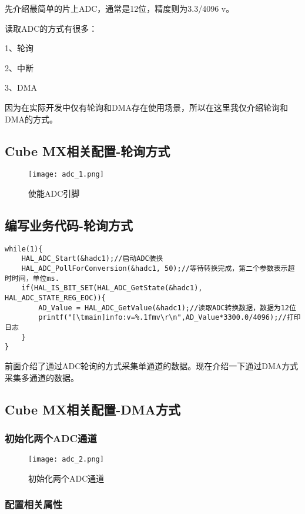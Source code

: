 \documentclass[cn,11pt]{elegantbook}
\begin{document}
先介绍最简单的片上ADC，通常是12位，精度则为3.3/4096 v。

读取ADC的方式有很多：

 1、轮询 
 
 2、中断 
 
 3、DMA 
 
因为在实际开发中仅有轮询和DMA存在使用场景，所以在这里我仅介绍轮询和DMA的方式。

\subsection{Cube MX相关配置-轮询方式}

\begin{figure}[htbp]
	\centering
	\texttt{[image: adc\_1.png]}
	\caption{使能ADC引脚 \label{fig:scatter}}
\end{figure}

\subsection{编写业务代码-轮询方式}
\lstset{language=C}
\begin{lstlisting}
while(1){
	HAL_ADC_Start(&hadc1);//启动ADC装换
	HAL_ADC_PollForConversion(&hadc1, 50);//等待转换完成，第二个参数表示超时时间，单位ms.
	if(HAL_IS_BIT_SET(HAL_ADC_GetState(&hadc1), HAL_ADC_STATE_REG_EOC)){
		AD_Value = HAL_ADC_GetValue(&hadc1);//读取ADC转换数据，数据为12位
		printf("[\tmain]info:v=%.1fmv\r\n",AD_Value*3300.0/4096);//打印日志
	}
}
\end{lstlisting}

前面介绍了通过ADC轮询的方式采集单通道的数据。现在介绍一下通过DMA方式采集多通道的数据。

\subsection{Cube MX相关配置-DMA方式}
\subsubsection{初始化两个ADC通道}
\newpage
\begin{figure}[htbp]
	\centering
	\texttt{[image: adc\_2.png]}
	\caption{初始化两个ADC通道 \label{fig:scatter}}
\end{figure}

\subsubsection{配置相关属性}
\end{document}
